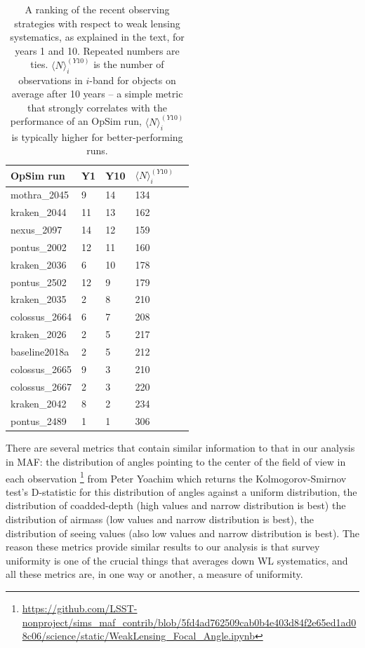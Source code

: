 \begin{table}[ht]
\caption{A ranking of the recent observing strategies with respect to weak lensing systematics, as
  explained in the text, for years 1 and 10. Repeated numbers are ties. $\langle N\rangle_i^{(Y10)}$
  is the number of observations in $i$-band for objects on average after 10 years -- a simple metric
  that strongly correlates with the performance of an OpSim run, $\langle N\rangle_i^{(Y10)}$ is typically higher for better-performing runs.}
\begin{tabular}{lllll}
\label{table:WLSystematicsRankings}
OpSim run & Y1 & Y10 & $\langle N\rangle_i^{(Y10)}$ \\ \hline
mothra\_2045   & {\color{orange}9} & {\color{red}14}    & 134 \\
kraken\_2044   & {\color{red}11}   & {\color{red}13}    & 162 \\
nexus\_2097    & {\color{red}14}   & {\color{red}12}    & 159 \\
pontus\_2002   & {\color{red}12}   & {\color{red}11}    & 160 \\
kraken\_2036   & {\color{yellow}6} & {\color{orange}10} & 178 \\
pontus\_2502   & {\color{red} 12}  & {\color{orange}9}  & 179 \\
kraken\_2035   & {\color{green}2}  & {\color{yellow}8}  & 210 \\
colossus\_2664 & {\color{yellow}6} & {\color{yellow}7}  & 208 \\
kraken\_2026   & {\color{green}2}  & {\color{yellow}5}  & 217 \\
baseline2018a  & {\color{green}2}  & {\color{yellow}5}  & 212 \\
colossus\_2665 & {\color{orange}9} & {\color{green}3}   & 210 \\ 
colossus\_2667 & {\color{green}2}  & {\color{green}3}   & 220 \\
kraken\_2042   & {\color{orange}8} & {\color{green}2}   & 234 \\
pontus\_2489   & {\color{green}1}  & {\color{green}1}   & 306

\end{tabular}
\end{table}

There are several metrics that contain similar information to that in our analysis in MAF: the distribution of angles pointing to the center of the field of view in each observation \footnote{\url{https://github.com/LSST-nonproject/sims\_maf\_contrib/blob/5fd4ad762509cab0b4e403d84f2e65ed1ad08c06/science/static/WeakLensing\_Focal\_Angle.ipynb}} from Peter Yoachim which returns the Kolmogorov-Smirnov test's D-statistic for this distribution of angles against a uniform distribution, the distribution of coadded-depth (high values and narrow distribution is best) the distribution of airmass (low values and narrow distribution is best), the distribution of seeing values (also low values and narrow distribution is best). The reason these metrics provide similar results to our analysis is that survey uniformity is one of the crucial things that averages down WL systematics, and all these metrics are, in one way or another, a measure of uniformity.


